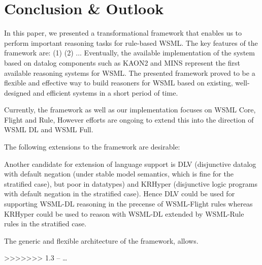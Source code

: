 \section{Conclusion \& Outlook\label{sec:outlook}}
In this paper, we presented a transformational framework that
enables us to perform important reasoning tasks for rule-based
WSML. The key features of the framework are: (1) (2) ...
Eventually, the available implementation of the system based on
datalog components such as KAON2 and MINS represent the first
available reasoning systems for WSML. The presented framework
proved to be a flexible and effective way to build reasoners for
WSML based on existing, well-designed and efficient systems in a
short period of time.

Currently, the framework as well as our implementation focuses on
WSML Core, Flight and Rule, However efforts are ongoing to extend
this into the direction of WSML DL and WSML Full.

The following extensions to the framework are desirable:

Another candidate for extension of language support is DLV
(disjunctive datalog with default negation (under stable model
semantics, which is fine for the stratified case), but poor in
datatypes) and KRHyper (disjunctive logic programs with default
negation in the stratified case). Hence DLV could be used for
supporting WSML-DL reasoning in the precense of WSML-Flight rules
whereas KRHyper could be used to reason with WSML-DL extended by
WSML-Rule rules in the stratified case.

The generic and flexible architecture of the framework, allows.

>>>>>>> 1.3
-- \dots
